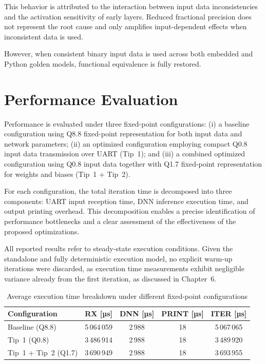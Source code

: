 This behavior is attributed to the interaction between input data inconsistencies and the activation sensitivity of early layers. Reduced fractional precision does not represent the root cause and only amplifies input-dependent effects when inconsistent data is used.

However, when consistent binary input data is used across both embedded and
Python golden models, functional equivalence is fully restored.




\chapter{Performance Evaluation}



Performance is evaluated under three fixed-point configurations:
(i) a baseline configuration using Q8.8 fixed-point representation for both input
data and network parameters;
(ii) an optimized configuration employing compact Q0.8 input data transmission
over UART (Tip~1);
and (iii) a combined optimized configuration using Q0.8 input data together with
Q1.7 fixed-point representation for weights and biases (Tip~1 + Tip~2).

For each configuration, the total iteration time is decomposed into three
components: UART input reception time, DNN inference execution time, and output
printing overhead.
This decomposition enables a precise identification of performance bottlenecks
and a clear assessment of the effectiveness of the proposed optimizations.

 All reported results refer to steady-state execution conditions.
Given the standalone and fully deterministic execution model, no explicit
warm-up iterations were discarded, as execution time measurements exhibit
negligible variance already from the first iteration, as discussed in
Chapter~6.


\begin{table}[H]
\centering
\caption{Average execution time breakdown under different fixed-point configurations}
\label{tab:perf_summary}
\renewcommand{\arraystretch}{1.2}
\begin{tabular}{|l|c|c|c|c|}
\hline
\textbf{Configuration} & \textbf{RX [µs]} & \textbf{DNN [µs]} & \textbf{PRINT [µs]} & \textbf{ITER [µs]} \\
\hline
Baseline (Q8.8)        & 5\,064\,059 & 2\,988 & 18 & 5\,067\,065 \\
Tip~1 (Q0.8)           & 3\,486\,914 & 2\,988 & 18 & 3\,489\,920 \\
Tip~1 + Tip~2 (Q1.7)   & 3\,690\,949 & 2\,988 & 18 & 3\,693\,955 \\
\hline
\end{tabular}
\end{table}

